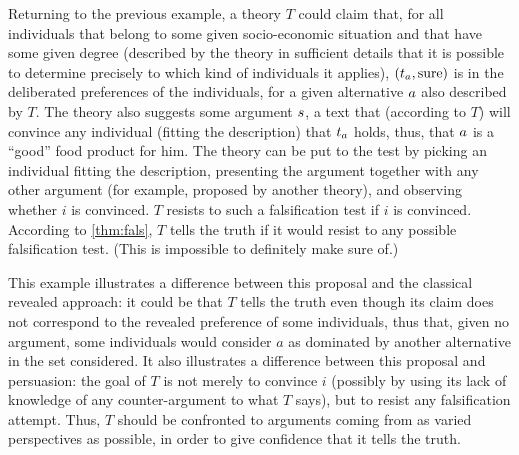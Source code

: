 \documentclass[version=last, pagesize, twoside=off, bibliography=totoc, DIV=calc, fontsize=12pt, a4paper, french, english]{scrartcl}
\begin{document}
\begin{example}[(cont.)]
	Returning to the previous example, a theory $T$ could claim that, for all individuals that belong to some given socio-economic situation and that have some given degree (described by the theory in sufficient details that it is possible to determine precisely to which kind of individuals it applies), $(t_a, \text{sure})$ is in the deliberated preferences of the individuals, for a given alternative $a$ also described by $T$. 
The theory also suggests some argument $s$, a text that (according to $T$) will convince any individual (fitting the description) that $t_a$ holds, thus, that $a$ is a “good” food product for him. 
The theory can be put to the test by picking an individual fitting the description, presenting the argument together with any other argument (for example, proposed by another theory), and observing whether $i$ is convinced.
$T$ resists to such a falsification test if $i$ is convinced. According to \cref{thm:fals}, $T$ tells the truth if it would resist to any possible falsification test. (This is impossible to definitely make sure of.)
\end{example}
This example illustrates a difference between this proposal and the classical revealed approach: it could be that $T$ tells the truth even though its claim does not correspond to the revealed preference of some individuals, thus that, given no argument, some individuals would consider $a$ as dominated by another alternative in the set considered. It also illustrates a difference between this proposal and persuasion: the goal of $T$ is not merely to convince $i$ (possibly by using its lack of knowledge of any counter-argument to what $T$ says), but to resist any falsification attempt. Thus, $T$ should be confronted to arguments coming from as varied perspectives as possible, in order to give confidence that it tells the truth.


\end{document}
